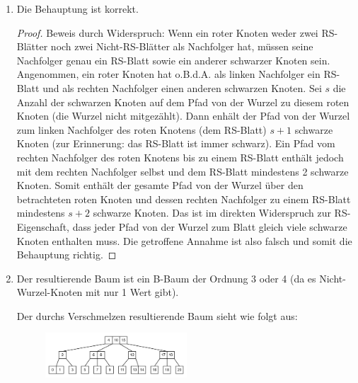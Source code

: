 \documentclass[11pt,a4paper]{article}
\begin{document}
\begin{loesung}
\begin{enumerate}[label=\alph*)]
        \item Die Behauptung ist korrekt.
        \begin{proof}
            Beweis durch Widerspruch:
            Wenn ein roter Knoten weder zwei RS-Blätter noch zwei Nicht-RS-Blätter als Nachfolger hat, müssen seine Nachfolger genau ein RS-Blatt sowie ein anderer schwarzer Knoten sein.
            Angenommen, ein roter Knoten hat o.B.d.A. als linken Nachfolger ein RS-Blatt und als rechten Nachfolger einen anderen schwarzen Knoten.
            Sei $s$ die Anzahl der schwarzen Knoten auf dem Pfad von der Wurzel zu diesem roten Knoten (die Wurzel nicht mitgezählt).
            Dann enhält der Pfad von der Wurzel zum linken Nachfolger des roten Knotens (dem RS-Blatt) $s + 1$ schwarze Knoten (zur Erinnerung: das RS-Blatt ist immer schwarz).
            Ein Pfad vom rechten Nachfolger des roten Knotens bis zu einem RS-Blatt enthält jedoch mit dem rechten Nachfolger selbst und dem RS-Blatt mindestens 2 schwarze Knoten.
            Somit enthält der gesamte Pfad von der Wurzel über den betrachteten roten Knoten und dessen rechten Nachfolger zu einem RS-Blatt mindestens $s + 2$ schwarze Knoten.
            Das ist im direkten Widerspruch zur RS-Eigenschaft, dass jeder Pfad von der Wurzel zum Blatt gleich viele schwarze Knoten enthalten muss.
            Die getroffene Annahme ist also falsch und somit die Behauptung richtig.
        \end{proof}

        \item
        Der resultierende Baum ist ein B-Baum der Ordnung 3 oder 4 (da es Nicht-Wurzel-Knoten mit nur 1 Wert gibt).

        Der durchs Verschmelzen resultierende Baum sieht wie folgt aus:
        \begin{figure}[h!]
            \centering
            \includegraphics[width=0.5\textwidth]{img/2d_solution.png}
        \end{figure}
        \FloatBarrier


\end{enumerate}
\end{loesung}
\end{document}
